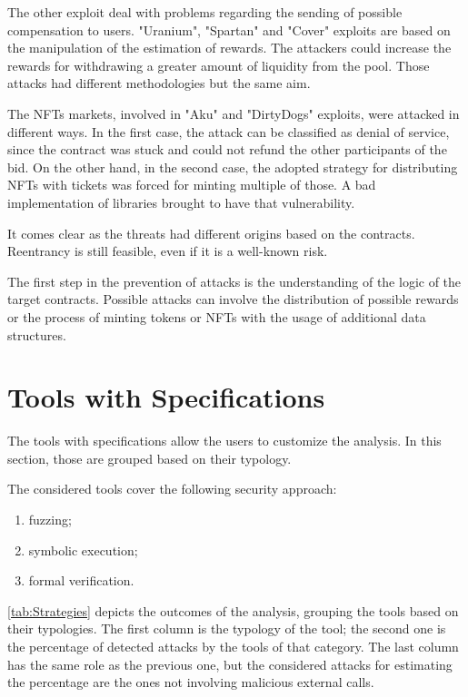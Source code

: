 The other exploit deal with problems regarding the sending of possible compensation to users. 
"Uranium", "Spartan" and "Cover" exploits are based on the manipulation of the estimation of rewards. 
The attackers could increase the rewards for withdrawing a greater amount of liquidity from the pool. Those attacks had different methodologies but the same aim. 

The NFTs markets, involved in "Aku" and "DirtyDogs" exploits, were attacked in different ways. 
In the first case, the attack can be classified as denial of service, since the contract was stuck and could not refund the other participants of the bid.
On the other hand, in the second case, the adopted strategy for distributing NFTs with tickets was forced for minting multiple of those. A bad implementation of libraries brought to have that vulnerability. 

It comes clear as the threats had different origins based on the contracts.
Reentrancy is still feasible, even if it is a well-known risk.

The first step in the prevention of attacks is the understanding of the logic of the target contracts. 
Possible attacks can involve the distribution of possible rewards or the process of minting tokens or NFTs with the usage of additional data structures. 



\section{Tools with Specifications}
The tools with specifications allow the users to customize the analysis. 
In this section, those are grouped based on their typology. 

The considered tools cover the following security approach:
\begin{enumerate}
    \item fuzzing;
    \item symbolic execution;
    \item formal verification. 
\end{enumerate} 

\autoref{tab:Strategies} depicts the outcomes of the analysis, grouping the tools based on their typologies. 
The first column is the typology of the tool; the second one is the percentage of detected attacks by the tools of that category. 
The last column has the same role as the previous one, but the considered attacks for estimating the percentage are the ones not involving malicious external calls.

